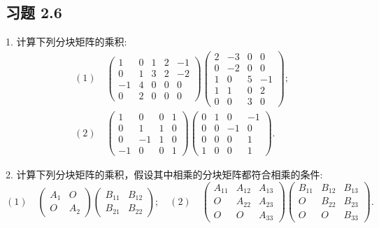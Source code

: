 \documentclass[UTF8, 12pt, fontset=fandol, oneside]{ctexart}
\begin{document}
\subsection*{习题 2.6}

1. 计算下列分块矩阵的乘积:
\[
\begin{array}{ll}
(1)\quad
\left(\begin{array}{cc|ccc}
1 & 0 & 1 & 2 & -1\\
0 & 1 & 3 & 2 & -2\\ \hline
-1 & 4 & 0 & 0 & 0\\
0 & 2 & 0 & 0 & 0
\end{array}\right)
\left(\begin{array}{cc|cc}
2 & -3 & 0 & 0\\
0 & -2 & 0 & 0\\ \hline
1 & 0 & 5 & -1\\
1 & 1 & 0 & 2\\
0 & 0 & 3 & 0
\end{array}\right);\\[3em]
(2)\quad
\left(\begin{array}{cc|cc}
1 & 0 & 0 & 1\\
0 & 1 & 1 & 0\\ \hline
0 & -1 & 1 & 0\\
-1 & 0 & 0 & 1
\end{array}\right)
\left(\begin{array}{cc|cc}
0 & 1 & 0 & -1\\
0 & 0 & -1 & 0\\ \hline
0 & 0 & 0 & 1\\
1 & 0 & 0 & 1
\end{array}\right).
\end{array}
\]

2. 计算下列分块矩阵的乘积，假设其中相乘的分块矩阵都符合相乘的条件:
\[
(1)\quad
\left(\begin{array}{cc}
A_1 & O\\
O & A_2
\end{array}\right)
\left(\begin{array}{cc}
B_{11} & B_{12}\\
B_{21} & B_{22}
\end{array}\right);
\quad
(2)\quad
\left(\begin{array}{ccc}
A_{11} & A_{12} & A_{13}\\
O & A_{22} & A_{23}\\
O & O & A_{33}
\end{array}\right)
\left(\begin{array}{ccc}
B_{11} & B_{12} & B_{13}\\
O & B_{22} & B_{23}\\
O & O & B_{33}
\end{array}\right).
\]
\end{document}
